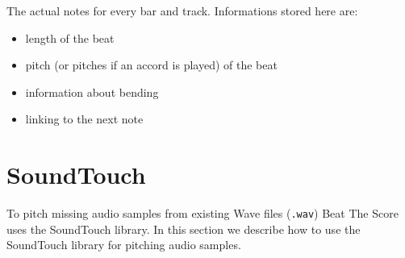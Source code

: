The actual notes for every bar and track. Informations stored here are:
\begin{itemize}
	\item length of the beat
	\item pitch (or pitches if an accord is played) of the beat
	\item information about bending
	\item linking to the next note
\end{itemize}

\section[SoundTouch \textsuperscript{Neumayer}]{SoundTouch}
\label{sec:SoundTouch}
To pitch missing audio samples from existing Wave files ({\tt .wav}) Beat The Score uses the SoundTouch library. In this section we describe how to use the SoundTouch library for pitching audio samples.

